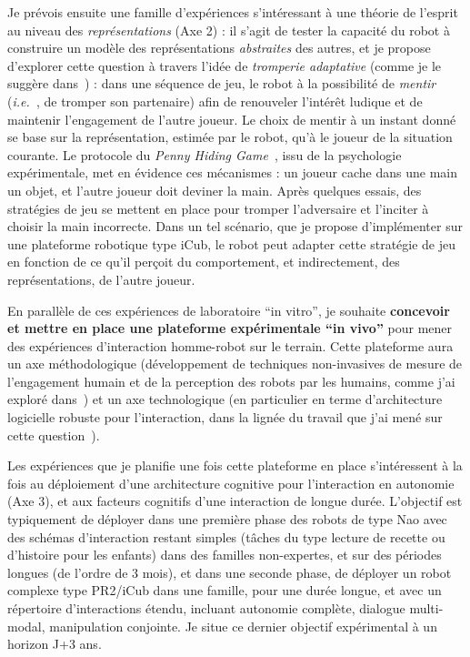\documentclass[a4paper]{article}
\newcommand{\ie}{{\textit{i.e.~}}}
\begin{document}
Je prévois ensuite une famille d'expériences s'intéressant à une théorie de
l'esprit au niveau des \emph{représentations} (Axe 2) : il s'agit de tester la
capacité du robot à construire un modèle des représentations \emph{abstraites}
des autres, et je propose d'explorer cette question à travers l'idée de
\emph{tromperie adaptative} (comme je le suggère
dans~\cite{lemaignan2015mutual}) : dans une séquence de jeu, le robot à la
possibilité de \emph{mentir} (\ie, de tromper son partenaire) afin de renouveler
l'intérêt ludique et de maintenir l'engagement de l'autre joueur. Le choix de
mentir à un instant donné se base sur la représentation, estimée par le robot,
qu'à le joueur de la situation courante. Le protocole du \emph{Penny Hiding
Game}~\cite{oswald1989role}, issu de la psychologie expérimentale, met en
évidence ces mécanismes : un joueur cache dans une main un objet, et l'autre
joueur doit deviner la main.  Après quelques essais, des stratégies de jeu se
mettent en place pour tromper l'adversaire et l'inciter à choisir la main
incorrecte. Dans un tel scénario, que je propose d'implémenter sur une
plateforme robotique type iCub, le robot peut adapter cette stratégie de jeu en
fonction de ce qu'il perçoit du comportement, et indirectement, des
représentations, de l'autre joueur.

En parallèle de ces expériences de laboratoire ``in vitro'', je souhaite
\textbf{concevoir et mettre en place une plateforme expérimentale ``in vivo''}
pour mener des expériences d'interaction homme-robot sur le terrain. Cette
plateforme aura un axe méthodologique (développement de techniques non-invasives
de mesure de l'engagement humain et de la perception des robots par les humains,
comme j'ai exploré
dans~\cite{lemaignan2014dynamics,lemaignan2014cognitive,fink2015anthropomorphism,sharma2015measuring})
et un axe technologique (en particulier en terme d'architecture logicielle
robuste pour l'interaction, dans la lignée du travail que j'ai mené sur cette
question~\cite{lemaignan2015human,lemaignan2015pyrobots}).

Les expériences que je planifie une fois cette plateforme en place s'intéressent
à la fois au déploiement d'une architecture cognitive pour l'interaction en
autonomie (Axe 3), et aux facteurs cognitifs d'une interaction de longue durée.
L'objectif est typiquement de déployer dans une première phase des robots de
type Nao avec des schémas d'interaction restant simples (tâches du type lecture
de recette ou d'histoire pour les enfants) dans des familles non-expertes, et
sur des périodes longues (de l'ordre de 3 mois), et dans une seconde phase, de
déployer un robot complexe type PR2/iCub dans une famille, pour une durée
longue, et avec un répertoire d'interactions étendu, incluant autonomie
complète, dialogue multi-modal, manipulation conjointe. Je situe ce dernier objectif
expérimental à un horizon J+3 ans.
\end{document}

